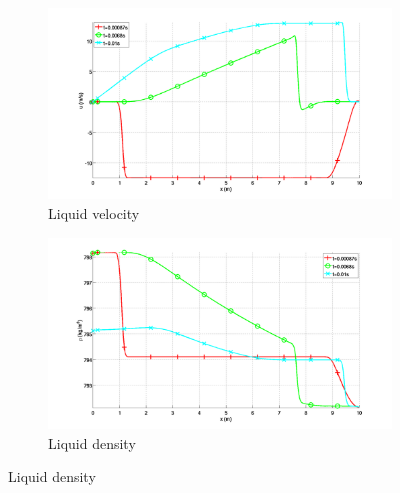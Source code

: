 \documentclass{mc2015}
\begin{document}
\begin{figure}[H]
        \centering
        \begin{subfigure}[b]{0.5\textwidth}
                \centering
                \includegraphics[width=\textwidth]{figures/Plot_velocity_liquid_phase.png}
                \caption{Liquid velocity}
                \label{fig:liq-phase-vel}
        \end{subfigure}%
        \begin{subfigure}[b]{0.5\textwidth}
                \centering
                \includegraphics[width=\textwidth]{figures/Plot_density_liquid_phase.png}
                \caption{Liquid density}
                \label{fig:liq-phase-density}
        \end{subfigure}
        

\end{figure}
\end{document}
